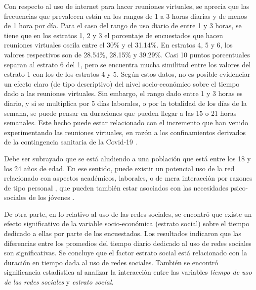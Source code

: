 \documentclass[spanish]{textolivre}
\begin{document}
Con respecto al uso de internet para hacer reuniones virtuales, se aprecia que las frecuencias que prevalecen están en los rangos de 1 a 3 horas diarias y de menos de 1 hora por día. Para el caso del rango de uso diario de entre 1 y 3 horas, se tiene que en los estratos 1, 2 y 3 el porcentaje de encuestados que hacen reuniones virtuales oscila entre el 30\% y el 31.14\%. En estratos 4, 5 y 6, los valores respectivos son de 28.54\%, 28.15\% y 39.29\%. Casi 10 puntos porcentuales separan al estrato 6 del 1, pero se encuentra mucha similitud entre los valores del estrato 1 con los de los estratos 4 y 5. Según estos datos, no es posible evidenciar un efecto claro (de tipo descriptivo) del nivel socio-económico sobre el tiempo dado a las reuniones virtuales. Sin embargo, el rango dado entre 1 y 3 horas es diario, y si se multiplica por 5 días laborales, o por la totalidad de los días de la semana, se puede pensar en duraciones que pueden llegar a las 15 o 21 horas semanales. Este hecho puede estar relacionado con el incremento que han venido experimentando las reuniones virtuales, en razón a los confinamientos derivados de la contingencia sanitaria de la Covid-19 \cite{antonello2020, karl2021}.

Debe ser subrayado que se está aludiendo a una población que está entre los 18 y los 24 años de edad. En ese sentido, puede existir un potencial uso de la red relacionado con aspectos académicos, laborales, o de mera interacción por razones de tipo personal \cite{danna2020}, que pueden también estar asociados con las necesidades psico-sociales de los jóvenes \cite{tomek1999, notley2009}.

De otra parte, en lo relativo al uso de las redes sociales, se encontró que existe un efecto significativo de la variable socio-económica (estrato social) sobre el tiempo dedicado a ellas por parte de los encuestados. Los resultados indicaron que las diferencias entre los promedios del tiempo diario dedicado al uso de redes sociales son significativas. Se concluye que el factor estrato social está relacionado con la duración en tiempo dada al uso de redes sociales. También se encontró significancia estadística al analizar la interacción entre las variables \emph{tiempo de uso de las redes sociales} y \emph{estrato social}.
\end{document}

